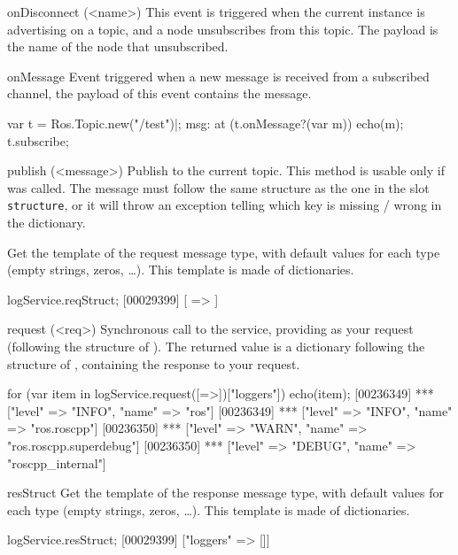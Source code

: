 \begin{urbiscriptapi}
\item[onDisconnect](<name>)%
  This event is triggered when the current instance is advertising on a
  topic, and a node unsubscribes from this topic. The payload is the name of
  the node that unsubscribed.


\item[onMessage]%
  Event triggered when a new message is received from a subscribed channel,
  the payload of this event contains the message.

\begin{urbiunchecked}
var t = Ros.Topic.new("/test")|;
msg: at (t.onMessage?(var m)) echo(m);
t.subscribe;
\end{urbiunchecked}


\item[publish](<message>)%
  Publish  to the current topic. This method is usable only if
   was called. The message must follow the same structure
  as the one in the slot \lstinline{structure}, or it will throw an
  exception telling which key is missing / wrong in the dictionary.


\item[reqStruct]%
  Get the template of the request message type, with default values for
  each type (empty strings, zeros, \ldots). This template is made of
  dictionaries.
\begin{urbiscript}
logService.reqStruct;
[00029399] [ => ]
\end{urbiscript}


\item[request](<req>)%
  Synchronous call to the service, providing  as your request
  (following the structure of ). The returned value is a
  dictionary following the structure of , containing the
  response to your request.
\begin{urbiscript}
for (var item in logService.request([=>])["loggers"])
  echo(item);
[00236349] *** ["level" => "INFO", "name" => "ros"]
[00236349] *** ["level" => "INFO", "name" => "ros.roscpp"]
[00236350] *** ["level" => "WARN", "name" => "ros.roscpp.superdebug"]
[00236350] *** ["level" => "DEBUG", "name" => "roscpp_internal"]
\end{urbiscript}


\item[resStruct]%
  Get the template of the response message type, with default values for
  each type (empty strings, zeros, \ldots). This template is made of
  dictionaries.
\begin{urbiscript}
logService.resStruct;
[00029399] ["loggers" => []]
\end{urbiscript}



\end{urbiscriptapi}

